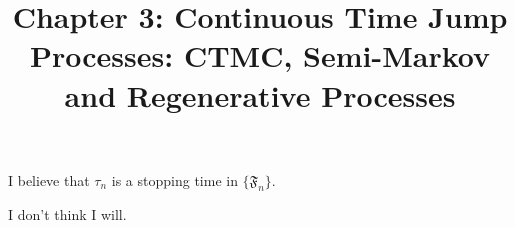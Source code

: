 \documentclass{article}
\title{Chapter 3: Continuous Time Jump Processes: CTMC, Semi-Markov and
Regenerative Processes}
\begin{document}
\maketitle

\begin{enumerate}

     I believe that $\tau_n$ is a stopping time in
    $\{\mathfrak{F}_n\}$.

     I don't think I will.

\end{enumerate}
\end{document}
